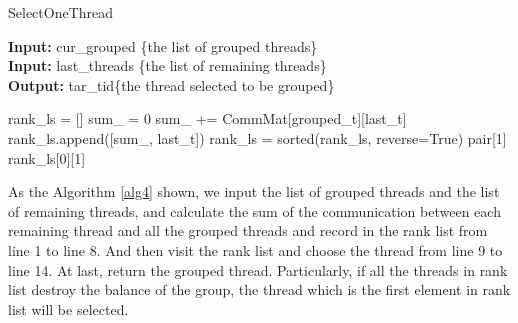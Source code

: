 \documentclass[a4paper,fleqn]{cas-sc}
\begin{document}
\begin{algorithm}
\caption{SelectOneThread} \label{alg4}%
\hspace*{0.02in} {\bf Input:} cur\_grouped \{the list of grouped threads\} \\
\hspace*{0.02in} {\bf Input:} last\_threads \{the list of remaining threads\} \\
\hspace*{0.02in} {\bf Output:} %
tar\_tid\{the thread selected to be grouped\}
\begin{algorithmic}[1]
\State rank\_ls = []
\State sum\_ = 0
\State sum\_ += CommMat[grouped\_t][last\_t]
\EndFor
\State rank\_ls.append([sum\_, last\_t])
\EndFor
\State rank\_ls = sorted(rank\_ls, reverse=True)
\State \Return pair[1]
\EndIf 
\EndFor
\State \Return rank\_ls[0][1]
\end{algorithmic}
\end{algorithm}

As the Algorithm \ref{alg4} shown, we input the list of grouped threads and the list of remaining threads, and calculate the sum of the communication between each remaining thread and all the grouped threads and record in the rank list from line 1 to line 8. And then visit the rank list and choose the thread from line 9 to line 14. At last, return the grouped thread. Particularly, if all the threads in rank list destroy the balance of the group, the thread which is the first element in rank list will be selected.
\end{document}
